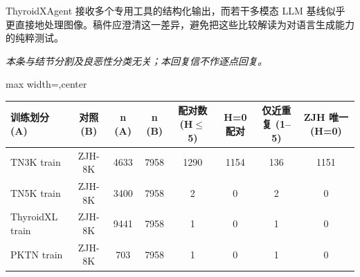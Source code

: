 \begin{reviewercomment}
ThyroidXAgent 接收多个专用工具的结构化输出，而若干多模态 LLM 基线似乎更直接地处理图像。稿件应澄清这一差异，避免把这些比较解读为对语言生成能力的纯粹测试。
\end{reviewercomment}
\begin{authorresponse}
\noindent\textit{本条与结节分割及良恶性分类无关；本回复信不作逐点回复。}
\end{authorresponse}
\responseappendixzh
\begin{responsetable}
\caption{}
\begin{adjustbox}{max width=\textwidth,center}
\begin{tabular}{lccccccc}
\toprule
训练划分 (A) & 对照 (B) & n (A) & n (B) & 配对数 (H$\leq$5) & H=0 配对 & 仅近重复 (1--5) & ZJH 唯一 (H=0) \\
\midrule
TN3K train & ZJH-8K & 4633 & 7958 & 1290 & 1154 & 136 & 1151 \\
TN5K train & ZJH-8K & 3400 & 7958 & 2 & 0 & 2 & 0 \\
ThyroidXL train & ZJH-8K & 9441 & 7958 & 1 & 0 & 1 & 0 \\
PKTN train & ZJH-8K & 703 & 7958 & 1 & 0 & 1 & 0 \\
\bottomrule
\end{tabular}
\end{adjustbox}
\end{responsetable}

